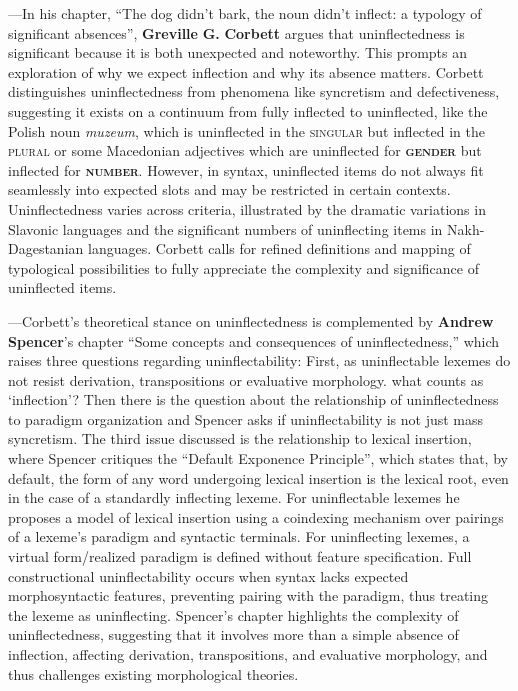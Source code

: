 \documentclass[output=paper]{langscibook}
\begin{document}
—In his chapter, “The dog didn’t bark, the noun didn’t inflect: a typology of significant absences”, \textbf{Greville} \textbf{G.} \textbf{Corbett} argues that uninflectedness is significant because it is both unexpected and noteworthy. This prompts an exploration of why we expect inflection and why its absence matters. Corbett distinguishes uninflectedness from phenomena like syncretism and defectiveness, suggesting it exists on a continuum from fully inflected to uninflected, like the Polish noun \textit{muzeum}, which is uninflected in the \textsc{singular} but inflected in the \textsc{plural} or some Macedonian adjectives which are uninflected for \textbf{\textsc{gender}} but inflected for \textbf{\textsc{number}}. However, in syntax, uninflected items do not always fit seamlessly into expected slots and may be restricted in certain contexts. Uninflectedness varies across criteria, illustrated by the dramatic variations in Slavonic languages and the significant numbers of uninflecting items in Nakh-Dagestanian languages. Corbett calls for refined definitions and mapping of typological possibilities to fully appreciate the complexity and significance of uninflected items.

—Corbett’s theoretical stance on uninflectedness is complemented by \textbf{Andrew} \textbf{Spencer}’s chapter “Some concepts and consequences of uninflectedness,” which raises three questions regarding uninflectability: First, as uninflectable lexemes do not resist derivation, transpositions or evaluative morphology. what counts as ‘inflection’? Then there is the question about the relationship of uninflectedness to paradigm organization and Spencer asks if uninflectability is not just mass syncretism. The third issue discussed is the relationship to lexical insertion, where Spencer critiques the “Default Exponence Principle”, which states that, by default, the form of any word undergoing lexical insertion is the lexical root, even in the case of a standardly inflecting lexeme. For uninflectable lexemes he proposes a model of lexical insertion using a coindexing mechanism over pairings of a lexeme’s paradigm and syntactic terminals. For uninflecting lexemes, a virtual form/realized paradigm is defined without feature specification. Full constructional uninflectability occurs when syntax lacks expected morphosyntactic features, preventing pairing with the paradigm, thus treating the lexeme as uninflecting. Spencer’s chapter highlights the complexity of uninflectedness, suggesting that it involves more than a simple absence of inflection, affecting derivation, transpositions, and evaluative morphology, and thus challenges existing morphological theories.
\end{document}
